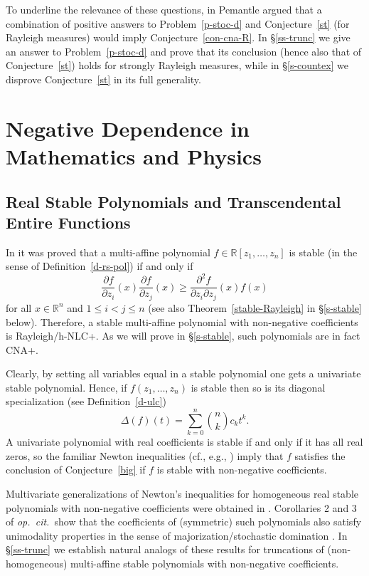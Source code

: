 \documentclass[10pt,reqno]{amsart}
\theoremstyle{plain}
\theoremstyle{definition}
\theoremstyle{remark}
\newcommand{\RR}{\mathbb{R}}
\newcommand{\De}{\Delta}
\begin{document}
To underline the relevance of these questions, in \cite[\S III.C]{P}
Pemantle argued that a combination of positive answers to
Problem~\ref{p-stoc-d} and Conjecture~\ref{st} (for Rayleigh 
measures) would imply Conjecture~\ref{con-cna-R}. In
\S \ref{ss-trunc} we give an answer to Problem~\ref{p-stoc-d} and prove that
its conclusion (hence also that of Conjecture~\ref{st}) 
holds for strongly Rayleigh measures, while in \S \ref{s-countex} we disprove
Conjecture~\ref{st} in its full generality.

\section{Negative Dependence in Mathematics and Physics}\label{s3-ex}

\subsection{Real Stable Polynomials and Transcendental Entire 
Functions}\label{ss-real-s}

In \cite{PB} it was proved that a multi-affine polynomial 
$f \in \RR[z_1,\ldots,z_n]$ is stable (in the sense of 
Definition~\ref{d-rs-pol}) 
if and only if 
\begin{equation}\label{stable}
\frac {\partial f} {\partial z_i}(x) \frac {\partial f} {\partial z_j}(x)
\geq \frac {\partial^2 f} {\partial z_i \partial z_j}(x) f(x)
\end{equation}
for all $x \in \RR^n$ and $1\leq i<j \leq n$ (see also 
Theorem~\ref{stable-Rayleigh} in \S \ref{s-stable} below). Therefore, 
a stable multi-affine polynomial with non-negative coefficients is 
Rayleigh/h-NLC+. As we will prove in \S \ref{s-stable}, such polynomials are 
in fact CNA+.

Clearly, by setting all variables equal in a stable polynomial one gets a 
univariate stable polynomial. Hence, if $f(z_1,\ldots,z_n)$ is stable then 
so is its diagonal specialization (see Definition~\ref{d-ulc})
$$
\De(f)(t)=\sum_{k=0}^n \binom n k c_k t^k.
$$
A univariate polynomial with real coefficients is stable if and only if it 
has all real zeros, so the familiar Newton inequalities 
(cf., e.g., \cite{CC,HLP}) imply that $f$ satisfies the conclusion of 
Conjecture~\ref{big} if $f$ is stable with non-negative coefficients. 

Multivariate generalizations of Newton's inequalities for homogeneous real
stable polynomials with non-negative coefficients were
obtained in \cite[Theorem 3]{BBS1}. Corollaries 2 and 3 of 
{\em op.~cit.~}show that the coefficients of (symmetric) such polynomials 
also satisfy unimodality properties in the sense of majorization/stochastic
domination \cite{MO}. In \S \ref{ss-trunc} we establish natural analogs
of these results for truncations of (non-homogeneous) multi-affine 
stable polynomials with non-negative coefficients.
\end{document}
